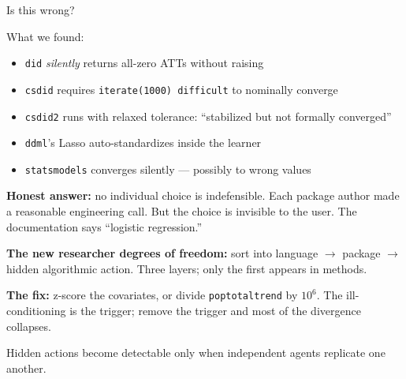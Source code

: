 \documentclass[aspectratio=169,11pt]{beamer}
\begin{document}
\begin{frame}[shrink=8]{Is this wrong?}

\small
What we found:

\begin{itemize}\setlength\itemsep{0.1em}
    \item \texttt{did} \emph{silently} returns all-zero ATTs without raising
    \item \texttt{csdid} requires \texttt{iterate(1000) difficult} to nominally converge
    \item \texttt{csdid2} runs with relaxed tolerance: ``stabilized but not formally converged''
    \item \texttt{ddml}'s Lasso auto-standardizes inside the learner
    \item \texttt{statsmodels} converges silently --- possibly to wrong values
\end{itemize}

\vspace{0.2cm}

\textbf{Honest answer:} no individual choice is indefensible. Each package author made a reasonable engineering call. But the choice is invisible to the user. The documentation says ``logistic regression.''

\vspace{0.15cm}

\textbf{The new researcher degrees of freedom:} sort into language $\rightarrow$ package $\rightarrow$ hidden algorithmic action. Three layers; only the first appears in methods.

\vspace{0.15cm}

\textbf{The fix:} z-score the covariates, or divide \texttt{poptotaltrend} by $10^6$. The ill-conditioning is the trigger; remove the trigger and most of the divergence collapses.

\vspace{0.15cm}

\alert{Hidden actions become detectable only when independent agents replicate one another.}

\end{frame}
\end{document}
